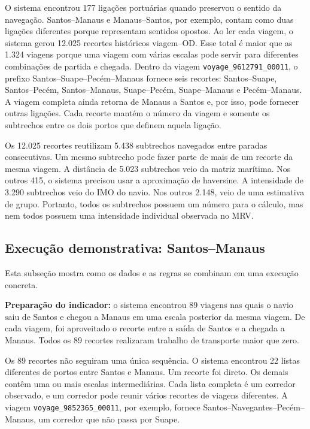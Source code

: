 \documentclass[12pt,a4paper]{article}
\begin{document}
O sistema encontrou 177 ligações portuárias quando preservou o sentido da navegação. Santos--Manaus e Manaus--Santos, por exemplo, contam como duas ligações diferentes porque representam sentidos opostos. Ao ler cada viagem, o sistema gerou 12.025 recortes históricos viagem--OD. Esse total é maior que as 1.324 viagens porque uma viagem com várias escalas pode servir para diferentes combinações de partida e chegada. Dentro da viagem \texttt{voyage\_9612791\_00011}, o prefixo Santos--Suape--Pecém--Manaus fornece seis recortes: Santos--Suape, Santos--Pecém, Santos--Manaus, Suape--Pecém, Suape--Manaus e Pecém--Manaus. A viagem completa ainda retorna de Manaus a Santos e, por isso, pode fornecer outras ligações. Cada recorte mantém o número da viagem e somente os subtrechos entre os dois portos que definem aquela ligação.

Os 12.025 recortes reutilizam 5.438 subtrechos navegados entre paradas consecutivas. Um mesmo subtrecho pode fazer parte de mais de um recorte da mesma viagem. A distância de 5.023 subtrechos veio da matriz marítima. Nos outros 415, o sistema precisou usar a aproximação de haversine. A intensidade de 3.290 subtrechos veio do IMO do navio. Nos outros 2.148, veio de uma estimativa de grupo. Portanto, todos os subtrechos possuem um número para o cálculo, mas nem todos possuem uma intensidade individual observada no MRV.

\subsection{Execução demonstrativa: Santos--Manaus}

Esta subseção mostra como os dados e as regras se combinam em uma execução concreta.

\textbf{Preparação do indicador:} o sistema encontrou 89 viagens nas quais o navio saiu de Santos e chegou a Manaus em uma escala posterior da mesma viagem. De cada viagem, foi aproveitado o recorte entre a saída de Santos e a chegada a Manaus. Todos os 89 recortes realizaram trabalho de transporte maior que zero.

Os 89 recortes não seguiram uma única sequência. O sistema encontrou 22 listas diferentes de portos entre Santos e Manaus. Um recorte foi direto. Os demais contêm uma ou mais escalas intermediárias. Cada lista completa é um corredor observado, e um corredor pode reunir vários recortes de viagens diferentes. A viagem \texttt{voyage\_9852365\_00011}, por exemplo, fornece Santos--Navegantes--Pecém--Manaus, um corredor que não passa por Suape.
\end{document}

